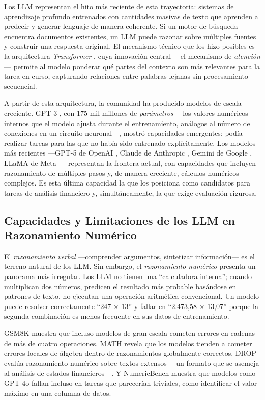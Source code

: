 \documentclass[12pt,a4paper]{article}
\begin{document}
Los LLM representan el hito más reciente de esta trayectoria: sistemas de aprendizaje profundo entrenados con cantidades masivas de texto que aprenden a predecir y generar lenguaje de manera coherente. Si un motor de búsqueda encuentra documentos existentes, un LLM puede razonar sobre múltiples fuentes y construir una respuesta original. El mecanismo técnico que los hizo posibles es la arquitectura \textit{Transformer} \citep{Vaswani2017}, cuya innovación central ---el mecanismo de \textit{atención}--- permite al modelo ponderar qué partes del contexto son más relevantes para la tarea en curso, capturando relaciones entre palabras lejanas sin procesamiento secuencial.

A partir de esta arquitectura, la comunidad ha producido modelos de escala creciente. GPT-3 \citep{Brown2020}, con 175 mil millones de \textit{parámetros} ---los valores numéricos internos que el modelo ajusta durante el entrenamiento, análogos al número de conexiones en un circuito neuronal---, mostró capacidades emergentes: podía realizar tareas para las que no había sido entrenado explícitamente. Los modelos más recientes ---GPT-5 de OpenAI \citep{OpenAI2024}, Claude de Anthropic \citep{Anthropic2025}, Gemini de Google \citep{GoogleDeepMind2024}, LLaMA de Meta \citep{Touvron2023}--- representan la frontera actual, con capacidades que incluyen razonamiento de múltiples pasos y, de manera creciente, cálculos numéricos complejos. Es esta última capacidad la que los posiciona como candidatos para tareas de análisis financiero y, simultáneamente, la que exige evaluación rigurosa.

\subsection{Capacidades y Limitaciones de los LLM en Razonamiento Numérico}

El \textit{razonamiento verbal} ---comprender argumentos, sintetizar información--- es el terreno natural de los LLM. Sin embargo, el \textit{razonamiento numérico} presenta un panorama más irregular. Los LLM no tienen una ``calculadora interna''; cuando multiplican dos números, predicen el resultado más probable basándose en patrones de texto, no ejecutan una operación aritmética convencional. Un modelo puede resolver correctamente ``247 × 13'' y fallar en ``2.473,58 × 13,07'' porque la segunda combinación es menos frecuente en sus datos de entrenamiento.

GSM8K \citep{Cobbe2021} muestra que incluso modelos de gran escala cometen errores en cadenas de más de cuatro operaciones. MATH \citep{Hendrycks2021b} revela que los modelos tienden a cometer errores locales de álgebra dentro de razonamientos globalmente correctos. DROP \citep{Dua2019} evalúa razonamiento numérico sobre textos extensos ---un formato que se asemeja al análisis de estados financieros---. Y NumericBench \citep{Li2024} muestra que modelos como GPT-4o fallan incluso en tareas que parecerían triviales, como identificar el valor máximo en una columna de datos.
\end{document}
